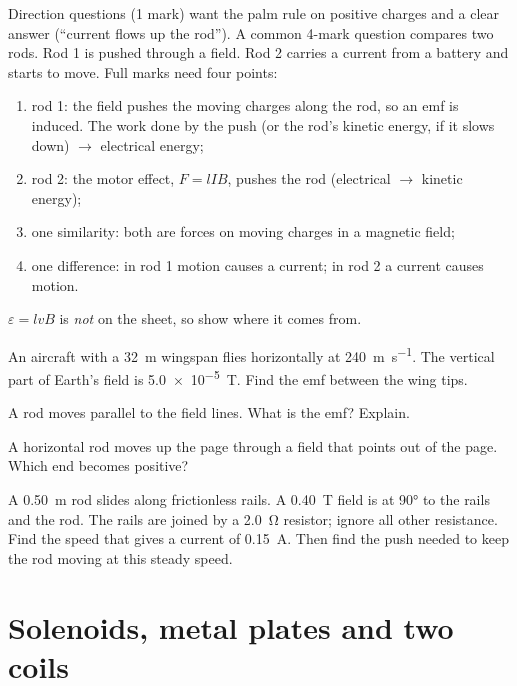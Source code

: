 \begin{examtip}
Direction questions (1 mark) want the palm rule on positive charges and a clear
answer (``current flows up the rod''). A common 4-mark question compares two
rods. Rod 1 is pushed through a field. Rod 2 carries a current from a battery and
starts to move. Full marks need four points:
\begin{enumerate}
  \item rod 1: the field pushes the moving charges along the rod, so an emf is
        induced. The work done by the push (or the rod's kinetic energy, if it
        slows down) $\to$ electrical energy;
  \item rod 2: the motor effect, $F = lIB$, pushes the rod (electrical
        $\to$ kinetic energy);
  \item one similarity: both are forces on moving charges in a magnetic field;
  \item one difference: in rod 1 motion causes a current; in rod 2 a current
        causes motion.
\end{enumerate}
$\varepsilon = lvB$ is \emph{not} on the sheet, so show where it comes from.
\end{examtip}

\begin{quickcheck}
  \item An aircraft with a \qty{32}{m} wingspan flies horizontally at
        \qty{240}{m.s^{-1}}. The vertical part of Earth's field is \qty{5.0e-5}{T}.
        Find the emf between the wing tips.
  \item A rod moves parallel to the field lines. What is the emf? Explain.
  \item A horizontal rod moves up the page through a field that points out of the
        page. Which end becomes positive?
  \item A \qty{0.50}{m} rod slides along frictionless rails. A \qty{0.40}{T}
        field is at \ang{90} to the rails and the rod. The rails are joined by a \qty{2.0}{\ohm} resistor; ignore all other
        resistance. Find the speed that gives a current of \qty{0.15}{A}. Then
        find the push needed to keep the rod moving at this steady speed.
\end{quickcheck}

\section{Solenoids, metal plates and two coils}\label{ch3:sec:solenoids}

